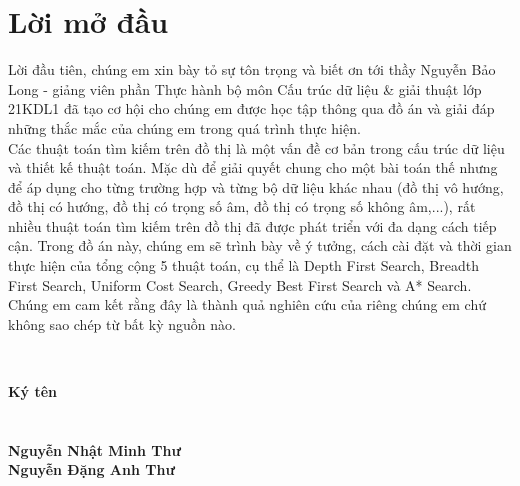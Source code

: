 \tableofcontents
\newpage
\chapter*{\centering Lời mở đầu}

\hspace{0.42cm}
Lời đầu tiên, chúng em xin bày tỏ sự tôn trọng và biết ơn tới thầy Nguyễn Bảo Long - giảng viên phần Thực hành bộ môn Cấu trúc dữ liệu \& giải thuật lớp 21KDL1 đã tạo cơ hội cho chúng em được học tập thông qua đồ án và giải đáp những thắc mắc của chúng em trong quá trình thực hiện.\\

\hspace{0.42cm}
Các thuật toán tìm kiếm trên đồ thị là một vấn đề cơ bản trong cấu trúc dữ liệu và thiết kế thuật toán. Mặc dù để giải quyết chung cho một bài toán thế nhưng để áp dụng cho từng trường hợp và từng bộ dữ liệu khác nhau (đồ thị vô hướng, đồ thị có hướng, đồ thị có trọng số âm, đồ thị có trọng số không âm,...), rất nhiều thuật toán tìm kiếm trên đồ thị đã được phát triển với đa dạng cách tiếp cận. Trong đồ án này, chúng em sẽ trình bày về ý tưởng, cách cài đặt và thời gian thực hiện của tổng cộng 5 thuật toán, cụ thể là Depth First Search, Breadth First Search, Uniform Cost Search, Greedy Best First Search và A* Search. \\

\hspace{0.42cm}
Chúng em cam kết rằng đây là thành quả nghiên cứu của riêng chúng em chứ không sao chép từ bất kỳ nguồn nào.\\


\begin{minipage}{0.5\textwidth}
\hspace{6cm} \ 
\end{minipage}
\begin{minipage}{0.4\textwidth}
    \begin{center}
    \textbf{Ký tên}\\ \ \\ \ \\

\textbf{Nguyễn Nhật Minh Thư}\\
\textbf{Nguyễn Đặng Anh Thư}
    \end{center}
\end{minipage}

